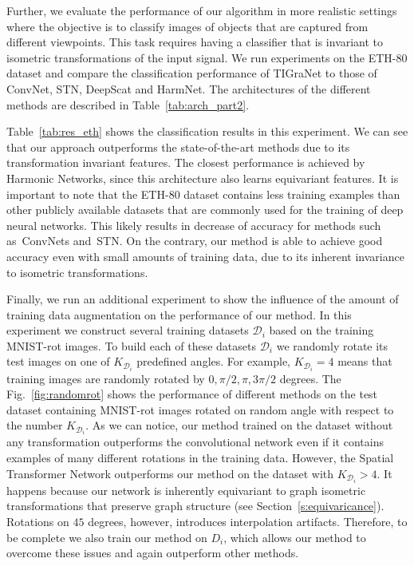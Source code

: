 \documentclass[10pt,journal,compsoc]{IEEEtran}
\begin{document}
	Further, we evaluate the performance of our algorithm in more realistic settings where the objective is to classify images of objects that are captured from different viewpoints. This task requires having a classifier that is invariant to isometric transformations of the input signal. We run experiments on the ETH-80 dataset and compare the classification performance of TIGraNet to those of ConvNet, STN, DeepScat and HarmNet. The architectures of the different methods are described in Table~\ref{tab:arch_part2}.

	Table~\ref{tab:res_eth} shows the classification results in this experiment. We can see that our approach outperforms the state-of-the-art methods due to its transformation invariant features. The closest performance is achieved by Harmonic Networks, since this architecture also learns equivariant features. It is important to note that the ETH-80 dataset contains less training examples than other publicly available datasets that are commonly used for the training of deep neural networks. This likely results in decrease of accuracy for methods such as~ConvNets and~STN. On the contrary, our method is able to achieve good accuracy even with small amounts of training data, due to its inherent invariance to isometric transformations.

	Finally, we run an additional experiment to show the influence of the amount of training data augmentation on the performance of our method. In this experiment we construct several training datasets $\mathcal{D}_i$ based on the training MNIST-rot images. To build each of these datasets $\mathcal{D}_i$ we randomly rotate its test images on one of $K_{\mathcal{D}_i}$ predefined angles. For example, $K_{\mathcal{D}_i}=4$ means that training images are randomly rotated by $0, \pi/2, \pi, 3\pi/2$ degrees. The Fig.~\ref{fig:randomrot} shows the performance of different methods on the test dataset containing MNIST-rot images rotated on random angle with respect to the number $K_{\mathcal{D}_i}$. As we can notice, our method trained on the dataset without any transformation outperforms the convolutional network even if it contains examples of many different rotations in the training data. However, the Spatial Transformer Network outperforms our method on the dataset with $K_{\mathcal{D}_i} > 4$. It happens because our network is inherently equivariant to graph isometric transformations that preserve graph structure (see Section~\ref{s:equivaricance}). Rotations on $45$ degrees, however, introduces interpolation artifacts.
	Therefore, to be complete we also train our method on $D_i$, which allows our method to overcome these issues and again outperform other methods.
\end{document}
